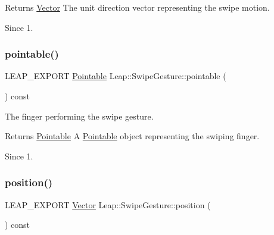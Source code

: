 \begin{DoxyReturn}{Returns}
\hyperlink{struct_leap_1_1_vector}{Vector} The unit direction vector representing the swipe motion. 
\end{DoxyReturn}
\begin{DoxySince}{Since}
1. 
\end{DoxySince}
\mbox{\label{class_leap_1_1_swipe_gesture_a5eebf38d6f7dba3d2f74efaa3b5a5bbb}} 
\subsubsection{\texorpdfstring{pointable()}{pointable()}}
{\footnotesize\ttfamily L\+E\+A\+P\+\_\+\+E\+X\+P\+O\+RT \hyperlink{class_leap_1_1_pointable}{Pointable} Leap\+::\+Swipe\+Gesture\+::pointable (\begin{DoxyParamCaption}{ }\end{DoxyParamCaption}) const}

The finger performing the swipe gesture.


\begin{DoxyCodeInclude}
\end{DoxyCodeInclude}


\begin{DoxyReturn}{Returns}
\hyperlink{class_leap_1_1_pointable}{Pointable} A \hyperlink{class_leap_1_1_pointable}{Pointable} object representing the swiping finger. 
\end{DoxyReturn}
\begin{DoxySince}{Since}
1. 
\end{DoxySince}
\mbox{\label{class_leap_1_1_swipe_gesture_a74e6f0190ac41b53b944551e5e26a9a4}} 
\subsubsection{\texorpdfstring{position()}{position()}}
{\footnotesize\ttfamily L\+E\+A\+P\+\_\+\+E\+X\+P\+O\+RT \hyperlink{struct_leap_1_1_vector}{Vector} Leap\+::\+Swipe\+Gesture\+::position (\begin{DoxyParamCaption}{ }\end{DoxyParamCaption}) const}

